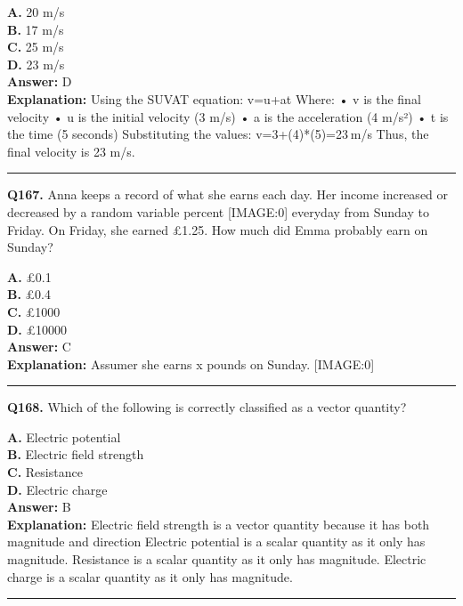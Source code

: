 \documentclass[12pt]{article}
\begin{document}
\textbf{A.} 20 m/s \\
\textbf{B.} 17 m/s \\
\textbf{C.} 25 m/s \\
\textbf{D.} 23 m/s \\

\textbf{Answer:} D \\
\textbf{Explanation:} Using the SUVAT equation: v=u+at
Where:
• v is the final velocity
• u is the initial velocity (3 m/s)
• a is the acceleration (4 m/s²)
• t is the time (5 seconds)
Substituting the values: v=3+(4)*(5)=23 m/s Thus, the final velocity is 23 m/s.

\hrule
\vspace{1em}


\noindent
\textbf{Q167.} Anna keeps a record of what she earns each day.
Her income increased or decreased by a random variable percent
[IMAGE:0]
everyday from Sunday to Friday.
On Friday, she earned £1.25. How much did Emma probably earn on Sunday?



\textbf{A.} £0.1 \\
\textbf{B.} £0.4 \\
\textbf{C.} £1000 \\
\textbf{D.} £10000 \\

\textbf{Answer:} C \\
\textbf{Explanation:} Assumer she earns x
pounds on Sunday.
[IMAGE:0]

\hrule
\vspace{1em}


\noindent
\textbf{Q168.} Which of the following is correctly classified as a vector quantity?



\textbf{A.} Electric potential \\
\textbf{B.} Electric field strength \\
\textbf{C.} Resistance \\
\textbf{D.} Electric charge \\

\textbf{Answer:} B \\
\textbf{Explanation:} Electric field strength is a vector quantity because it has both magnitude and direction
Electric potential is a scalar quantity as it only has magnitude.
Resistance is a scalar quantity as it only has magnitude.
Electric charge is a scalar quantity as it only has magnitude.

\hrule
\vspace{1em}
\end{document}
